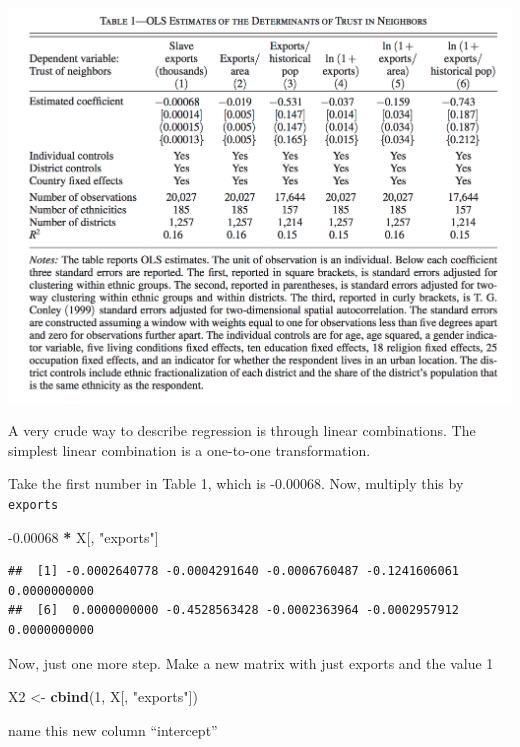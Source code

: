 \documentclass[
]{book}
\newenvironment{Shaded}{\begin{snugshade}}{\end{snugshade}}
\newcommand{\DecValTok}[1]{\textcolor[rgb]{0.00,0.00,0.81}{#1}}
\newcommand{\FloatTok}[1]{\textcolor[rgb]{0.00,0.00,0.81}{#1}}
\newcommand{\KeywordTok}[1]{\textcolor[rgb]{0.13,0.29,0.53}{\textbf{#1}}}
\newcommand{\NormalTok}[1]{#1}
\newcommand{\OperatorTok}[1]{\textcolor[rgb]{0.81,0.36,0.00}{\textbf{#1}}}
\newcommand{\StringTok}[1]{\textcolor[rgb]{0.31,0.60,0.02}{#1}}
\theoremstyle{definition}
\theoremstyle{definition}
\theoremstyle{definition}
\theoremstyle{remark}
\begin{document}
\includegraphics{images/nunn_wantchekon_table1.png}

A very crude way to describe regression is through linear combinations. The simplest linear combination is a one-to-one transformation.

Take the first number in Table 1, which is -0.00068. Now, multiply this by \texttt{exports}

\begin{Shaded}
\begin{Highlighting}[]
\FloatTok{{-}0.00068} \OperatorTok{*}\StringTok{ }\NormalTok{X[, }\StringTok{"exports"}\NormalTok{]}
\end{Highlighting}
\end{Shaded}

\begin{verbatim}
##  [1] -0.0002640778 -0.0004291640 -0.0006760487 -0.1241606061  0.0000000000
##  [6]  0.0000000000 -0.4528563428 -0.0002363964 -0.0002957912  0.0000000000
\end{verbatim}

Now, just one more step. Make a new matrix with just exports and the value 1

\begin{Shaded}
\begin{Highlighting}[]
\NormalTok{X2 <{-}}\StringTok{ }\KeywordTok{cbind}\NormalTok{(}\DecValTok{1}\NormalTok{, X[, }\StringTok{"exports"}\NormalTok{])}
\end{Highlighting}
\end{Shaded}

name this new column ``intercept''
\end{document}
